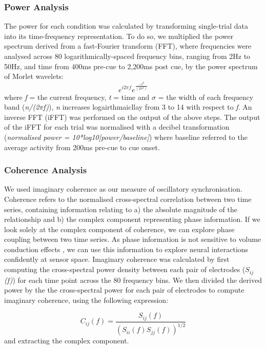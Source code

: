 \documentclass[preprint,authoryear,11pt,5p,times,twocolumns]{elsarticle}
\begin{document}
\subsubsection{Power Analysis}

The power for each condition was calculated by transforming single-trial data into its time-frequency representation. To do so, we multiplied the power spectrum derived from a fast-Fourier transform (FFT), where frequencies were analysed across 80 logarithmically-spaced frequency bins, ranging from 2Hz to 50Hz, and time from 400ms pre-cue to 2,200ms post cue, by the power spectrum of Morlet wavelets:
\begin{equation}
e ^{i 2 \pi f}e^{\frac{-t^2}{(2\sigma^2)}}
\end{equation} where \emph{f} = the current frequency, \emph{t} = time and \emph{$\sigma$} = the width of each frequency band (\emph{n/(2$\pi$f)}), \emph{n} increases logairthmaicllay from 3 to 14 with respect to \emph{f}. An inverse FFT (iFFT) was performed on the output of the above steps. The output of the iFFT for each trial was normalised with a decibel transformation (\emph{normalised power = 10*log10[power/baseline]}) where baseline referred to the average activity from 200ms pre-cue to cue onset. 
\subsubsection{Coherence Analysis}
We used imaginary coherence as our measure of oscillatory synchronisation. Coherence refers to the normalised cross-spectral correlation between two time series, containing information relating to a) the absolute magnitude of the relationship and b) the complex component representing phase information. If we look solely at the complex component of coherence, we can explore phase coupling between two time series. As phase information is not sensitive to volume conduction effects \citep{Nolte2004}, we can use this information to explore neural interactions confidently at sensor space. Imaginary coherence was calculated by first computing the cross-spectral power density  between each pair of electrodes (\emph{$S_{ij}$(f)}) for each time point across the 80 frequency bins. We then divided the derived power by the the cross-spectral power for each pair of electrodes to compute imaginary coherence, using the following expression:

\begin{equation}
C_{ij}(f) = \frac{S_{ij}(f)}{(S_{ii}(f)S_{jj}(f))^{1/2}}
\end{equation}
and extracting the complex component.
\end{document}
